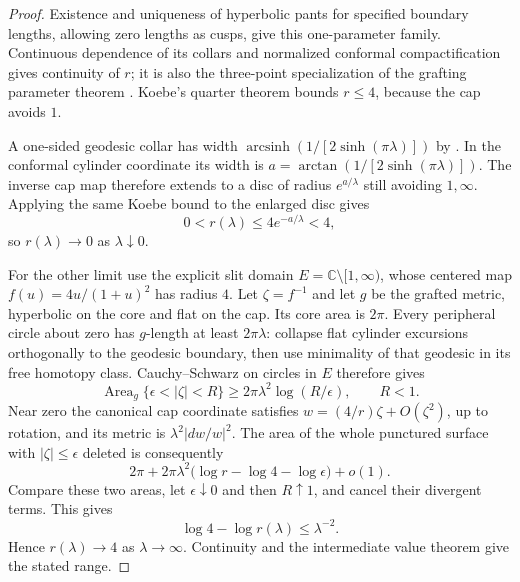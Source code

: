 \documentclass[11pt,a4paper]{article}
\theoremstyle{definition}
\newcommand{\C}{\mathbb C}
\begin{document}
\begin{proof}
Existence and uniqueness of hyperbolic pants for specified boundary lengths, allowing zero lengths as cusps, give this one-parameter family. Continuous dependence of its collars and normalized conformal compactification gives continuity of $r$; it is also the three-point specialization of the grafting parameter theorem \cite[Theorem~5.4, p.~660]{Mondello}. Koebe's quarter theorem bounds $r\le4$, because the cap avoids $1$.

A one-sided geodesic collar has width $\operatorname{arcsinh}(1/[2\sinh(\pi\lambda)])$ by \cite[Lemma~A.1, p.~668]{Mondello}. In the conformal cylinder coordinate its width is
$a=\arctan(1/[2\sinh(\pi\lambda)])$. The inverse cap map therefore extends to a disc of radius $e^{a/\lambda}$ still avoiding $1,\infty$. Applying the same Koebe bound to the enlarged disc gives
\begin{equation}\label{eq:radius-upper}
 0<r(\lambda)\le4e^{-a/\lambda}<4,
\end{equation}
so $r(\lambda)\to0$ as $\lambda\downarrow0$.

For the other limit use the explicit slit domain $E=\C\setminus[1,\infty)$, whose centered map $f(u)=4u/(1+u)^2$ has radius $4$. Let $\zeta=f^{-1}$ and let $g$ be the grafted metric, hyperbolic on the core and flat on the cap. Its core area is $2\pi$. Every peripheral circle about zero has $g$-length at least $2\pi\lambda$: collapse flat cylinder excursions orthogonally to the geodesic boundary, then use minimality of that geodesic in its free homotopy class. Cauchy--Schwarz on circles in $E$ therefore gives
\[
 \operatorname{Area}_g\{\epsilon<|\zeta|<R\}
 \ge2\pi\lambda^2\log(R/\epsilon),\qquad R<1.
\]
Near zero the canonical cap coordinate satisfies $w=(4/r)\zeta+O(\zeta^2)$, up to rotation, and its metric is $\lambda^2|dw/w|^2$. The area of the whole punctured surface with $|\zeta|\le\epsilon$ deleted is consequently
\[
 2\pi+2\pi\lambda^2\bigl(\log r-\log4-\log\epsilon\bigr)+o(1).
\]
Compare these two areas, let $\epsilon\downarrow0$ and then $R\uparrow1$, and cancel their divergent terms. This gives
\begin{equation}\label{eq:radius-lower}
 \log4-\log r(\lambda)\le\lambda^{-2}.
\end{equation}
Hence $r(\lambda)\to4$ as $\lambda\to\infty$. Continuity and the intermediate value theorem give the stated range.
\end{proof}
\end{document}
